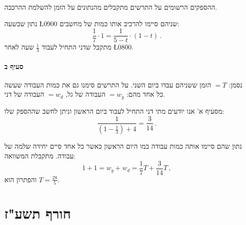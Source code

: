 \documentclass[12pt,a4paper]{article}
\newcommand*{\p}[1]{\textsf{\small #1}}
\begin{document}
\smallskip

ההספקים הרשומים על התרשים מתקבלים מהנתונים על הזמן להשלמת ההרכבה.

\smallskip

נתון שבשעה 
\L{\p{0900}}
שניהם סיימו להרכיב אותו כמות של מחשבים:
\[
\frac{1}{7}\cdot 1 = \frac{1}{5-t} \cdot (1-t)\,.
\]
מתקבל שדני התחיל לעבוד
$\displaystyle\frac{1}{3}$
שעה לאחר
\L{\p{0800}}.

\paragraph{סעיף ב}

\begin{center}
\end{center}
נסמן: 
$=T$
הזמן ששניהם עבדו ביום השני. על התרשים סימנו גם את כמות העבודה שעשה כל אחד מהם:
$=w_g$
העבודה של גל,
$=w_d$
העבודה של דני.

\smallskip

מסעיף א' אנו יודעים מתי דני התחיל לעבוד ביום הראשון וניתן לחשב שההספק שלו:
\[
\frac{1}{\left(1-\frac{1}{3}\right)+4}=\frac{3}{14}\,.
\]

\smallskip

נתון שהם סיימו אותה כמות עבודה כמו היום הראשון כאשר כל אחד סיים יחידה שלמה של עבודה. מתקבלת המשוואה:
\[
1+1=w_g+w_d=\frac{1}{7}T + \frac{3}{14}T\,,
\]
והפתרון הוא 
$T=\displaystyle \frac{28}{5}$.

\newpage


\section*{חורף תשע"ז}
\end{document}
